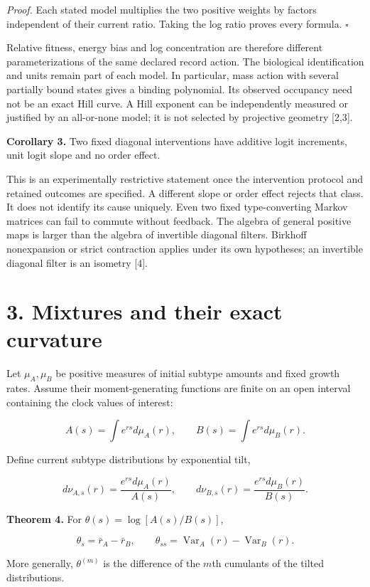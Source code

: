 \documentclass[
  11pt,
  a4paper,
]{article}
\begin{document}
\emph{Proof.} Each stated model multiplies the two positive weights by factors independent of their current ratio. Taking the log ratio proves every formula. \(\square\)

Relative fitness, energy bias and log concentration are therefore different parameterizations of the same declared record action. The biological identification and units remain part of each model. In particular, mass action with several partially bound states gives a binding polynomial. Its observed occupancy need not be an exact Hill curve. A Hill exponent can be independently measured or justified by an all-or-none model; it is not selected by projective geometry {[}2,3{]}.

\textbf{Corollary 3.} Two fixed diagonal interventions have additive logit increments, unit logit slope and no order effect.

This is an experimentally restrictive statement once the intervention protocol and retained outcomes are specified. A different slope or order effect rejects that class. It does not identify its cause uniquely. Even two fixed type-converting Markov matrices can fail to commute without feedback. The algebra of general positive maps is larger than the algebra of invertible diagonal filters. Birkhoff nonexpansion or strict contraction applies under its own hypotheses; an invertible diagonal filter is an isometry {[}4{]}.

\section{3. Mixtures and their exact curvature}\label{mixtures-and-their-exact-curvature}

Let \(\mu_A,\mu_B\) be positive measures of initial subtype amounts and fixed growth rates. Assume their moment-generating functions are finite on an open interval containing the clock values of interest:

\[A(s)=\int e^{rs}d\mu_A(r),\qquad B(s)=\int e^{rs}d\mu_B(r).
\]

Define current subtype distributions by exponential tilt,

\[d\nu_{A,s}(r)=\frac{e^{rs}d\mu_A(r)}{A(s)},
\qquad d\nu_{B,s}(r)=\frac{e^{rs}d\mu_B(r)}{B(s)}.\]

\textbf{Theorem 4.} For \(\theta(s)=\log[A(s)/B(s)]\),

\[\theta_s=\bar r_A-\bar r_B,\qquad
\theta_{ss}=\operatorname{Var}_A(r)-\operatorname{Var}_B(r).\]

More generally, \(\theta^{(m)}\) is the difference of the \(m\)th cumulants of the tilted distributions.
\end{document}
